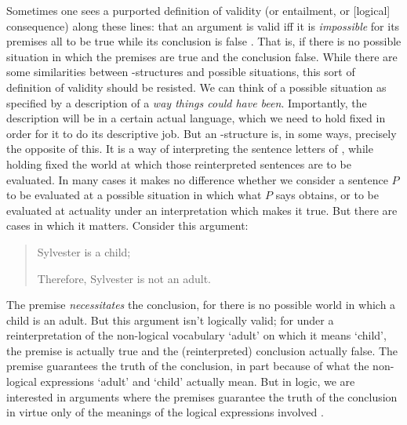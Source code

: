  Sometimes one sees a purported definition of validity (or entailment, or [logical] consequence) along these lines: that an argument is valid iff it is \emph{impossible} for its premises all to be true while its conclusion is false \citep[19]{sweetreas}. That is, if there is no possible situation in which the premises are true and the conclusion false. While there are some similarities between \lone-structures and possible situations, this sort of definition of validity should be resisted. We can think of a possible situation as specified by a description of a \emph{way things could have been}. Importantly, the description will be in a certain actual language, which we need to hold fixed in order for it to do its descriptive job. But an \lone-structure is, in some ways, precisely the opposite of this. It is a way of interpreting the sentence letters of \lone, while holding fixed the world at which those reinterpreted sentences are to be evaluated. In many cases it makes no difference whether we consider a sentence $P$ to be evaluated at a possible situation in which what $P$ says obtains, or to be evaluated at actuality under an interpretation which makes it true. But there are cases in which it matters. Consider this argument: \begin{quotation}
	Sylvester is a child;

	Therefore, Sylvester is not an adult.
\end{quotation}
The premise \emph{necessitates} the conclusion, for there is no possible world in which a child is an adult. But this argument isn't logically valid; for under a reinterpretation of the non-logical vocabulary ‘adult’ on which it means ‘child’, the premise is actually true and the (reinterpreted) conclusion actually false. The premise guarantees the truth of the conclusion, in part because of what the non-logical expressions ‘adult’ and ‘child’ actually mean. But in logic, we are interested in arguments where the premises guarantee the truth of the conclusion in virtue only of the meanings of the logical expressions involved \citep{tarski}.

